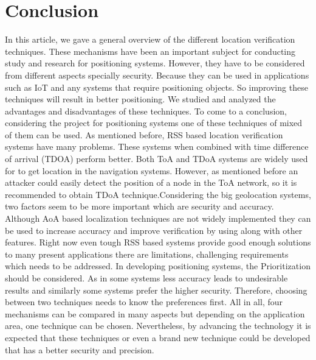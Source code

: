\documentclass[conference]{IEEEtran}
\begin{document}
\section{Conclusion}
In this article, we gave a general overview of the different location verification techniques. These mechanisms have been an important subject for conducting study and research for positioning systems. However, they have to be considered from different aspects specially security. Because they can be used in applications such as IoT and any systems that require positioning objects. So improving these techniques will result in better positioning. We studied and analyzed the advantages and disadvantages of these techniques. To come to a conclusion, considering the project for positioning systems one of these techniques of mixed of them can be used. 
As mentioned before, RSS based location verification systems have many problems. These systems when combined with time difference of arrival (TDOA) perform better. Both ToA and TDoA systems are widely used for to get location in the navigation systems. However, as mentioned before an attacker could easily detect the position of a node in the ToA network, so it is recommended to obtain TDoA technique.Considering the big geolocation systems, two factors seem to be more important which are security and accuracy. Although AoA based localization techniques are not widely implemented they can be used to increase accuracy and improve verification by using along with other features. Right now even tough RSS based systems provide good enough solutions to many present applications there are limitations, challenging requirements which needs to be addressed.
In developing positioning systems, the Prioritization should be considered. As in some systems less accuracy leads to undesirable results and similarly some systems prefer the higher security. Therefore, choosing between two techniques needs to know the preferences first. All in all, four mechanisms can be compared in many aspects but depending on the application area, one technique can be chosen. Nevertheless, by advancing the technology it is expected that these techniques or even a brand new technique could be developed that has a better security and precision.
\end{document}
